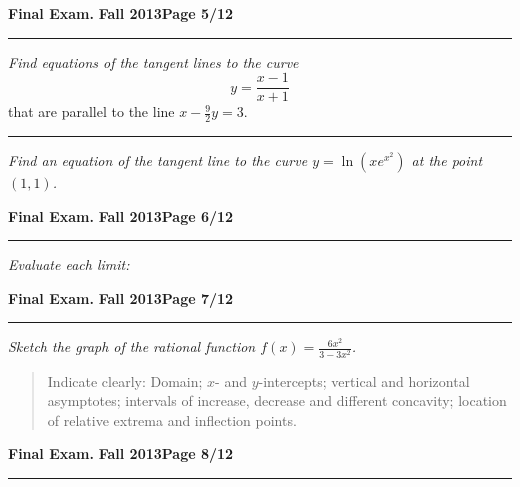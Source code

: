 \documentclass[12pt]{article}
\begin{document}
\newpage

\hfill{\large\bf Final Exam.}\hfill{\large\bf
  Fall 2013}\hfill{\large\bf Page 5/12}\hrule

\bigskip
{\problem[15 pts] \em Find equations of the tangent lines to the curve}
\begin{equation*}
  y = \frac{x-1}{x+1}
\end{equation*}
that are parallel to the line $x-\tfrac{9}{2} y=3$.
\vspace{10cm}
\hrule

{\problem[15 pts] \em Find an equation of the tangent line to the curve
$y=\ln( x e^{x^2})$ at the point $(1,1)$.}

\newpage

\hfill{\large\bf Final Exam.}\hfill{\large\bf
  Fall 2013}\hfill{\large\bf Page 6/12}\hrule

\bigskip
{\problem[20 pts] \em  Evaluate each limit:} 

\bigskip
{}

\vspace{9cm}

\newpage

\hfill{\large\bf Final Exam.}\hfill{\large\bf
  Fall 2013}\hfill{\large\bf Page 7/12}\hrule

\bigskip
{\problem[30 pts] \em Sketch the graph of the rational function $f(x)
  = \displaystyle{\frac{6x^2}{3-3x^2}}$.}
\begin{quotation}
Indicate clearly: Domain; $x$- and $y$-intercepts; vertical and horizontal asymptotes; intervals of increase, decrease and different concavity; location of relative extrema and inflection points.
\end{quotation}
\newpage

\hfill{\large\bf Final Exam.}\hfill{\large\bf
  Fall 2013}\hfill{\large\bf Page 8/12}\hrule
\end{document}
